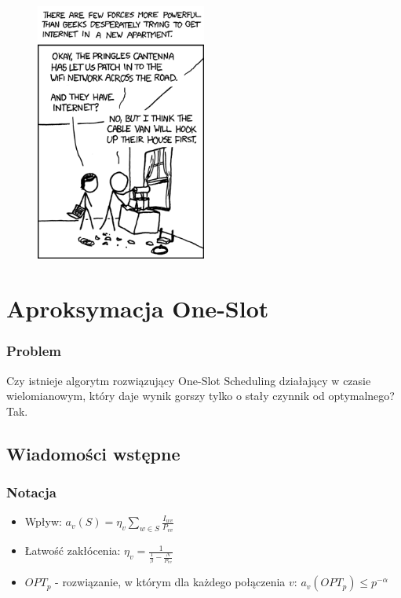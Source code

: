 \documentclass[polish, t,10pt]{beamer}
\begin{document}
\begin{frame}[c]
    \begin{figure}
        \includegraphics[width=0.5\textwidth]{pictures/obligatory-xkcd.png}
    \end{figure}
\end{frame}

\section{Aproksymacja One-Slot}
\begin{frame}
    \frametitle{Problem}
        Czy istnieje algorytm rozwiązujący One-Slot Scheduling działający w czasie wielomianowym,
        który daje wynik gorszy tylko o stały czynnik od optymalnego?
        \pause
        \vfill
        Tak.
\end{frame}

\subsection{Wiadomości wstępne}
\begin{frame}
    \frametitle{Notacja}
    \begin{itemize}
        \item Wpływ: $a_v(S) = \eta_v \sum_{w \in S} \frac{I_{wv}}{P_{vv}}$
        \item Łatwość zakłócenia: $\eta_v = \frac{1}{\frac{1}{\beta} - \frac{N}{P_{vv}}}$
        \item $OPT_p$ - rozwiązanie, w którym dla każdego połączenia $v$: $a_v(OPT_p) \le p^{-\alpha}$
    \end{itemize}
\end{frame}
\end{document}
